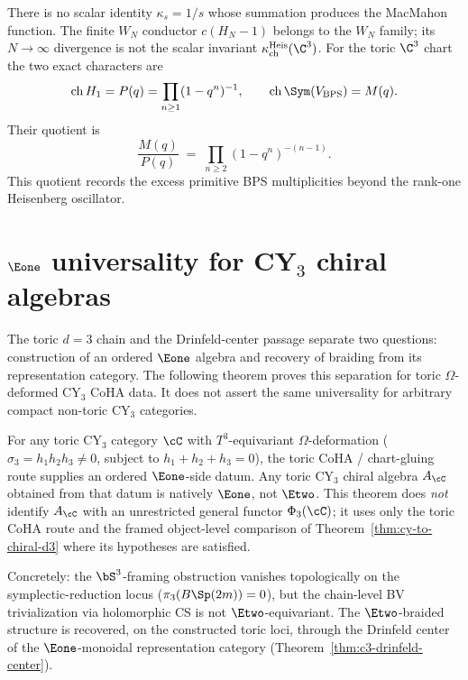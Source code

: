 \begin{remark}
\label{rem:c3-per-channel}
There is no scalar identity \(\kappa_s=1/s\) whose summation produces
the MacMahon function. The finite \(W_N\) conductor
\(c(H_N-1)\) belongs to the \(W_N\) family; its \(N\to\infty\) divergence
is not the scalar invariant \(\kappa_{\mathrm{ch}}^{\mathrm{Heis}}(\C^3)\).
For the toric \(\C^3\) chart the two exact characters are
\[
 \mathrm{ch}\,H_1=P(q)=\prod_{n\geq 1}(1-q^n)^{-1},
 \qquad
 \mathrm{ch}\,\Sym(V_{\mathrm{BPS}})=M(q).
\]
Their quotient is
\[
 \frac{M(q)}{P(q)} \;=\; \prod_{n \geq 2}(1-q^n)^{-(n-1)}.
\]
This quotient records the excess primitive BPS multiplicities beyond the
rank-one Heisenberg oscillator.
\end{remark}


\section{\texorpdfstring{$\Eone$}{E1} universality for CY\texorpdfstring{$_3$}{-3} chiral algebras}
\label{sec:e1-universality}

The toric $d = 3$ chain and the Drinfeld-center passage separate two questions: construction of an ordered $\Eone$ algebra and recovery of braiding from its representation category. The following theorem proves this separation for toric $\Omega$-deformed CY$_3$ CoHA data. It does not assert the same universality for arbitrary compact non-toric CY$_3$ categories.


\begin{theorem}
\label{thm:e1-universality-cy3}
For any toric CY$_3$ category $\cC$ with $T^3$-equivariant $\Omega$-deformation ($\sigma_3 = h_1 h_2 h_3 \neq 0$, subject to $h_1 + h_2 + h_3 = 0$), the toric CoHA / chart-gluing route supplies an ordered $\Eone$-side datum. Any toric CY$_3$ chiral algebra $A_\cC$ obtained from that datum is natively $\Eone$, not $\Etwo$. This theorem does \emph{not} identify $A_\cC$ with an unrestricted general functor $\Phi_3(\cC)$; it uses only the toric CoHA route and the framed object-level comparison of Theorem~\textup{\ref{thm:cy-to-chiral-d3}} where its hypotheses are satisfied.

Concretely: the $\bS^3$-framing obstruction vanishes topologically on the symplectic-reduction locus ($\pi_3(B\Sp(2m)) = 0$), but the chain-level BV trivialization via holomorphic CS is not $\Etwo$-equivariant. The $\Etwo$-braided structure is recovered, on the constructed toric loci, through the Drinfeld center of the $\Eone$-monoidal representation category (Theorem~\textup{\ref{thm:c3-drinfeld-center}}).
\end{theorem}


